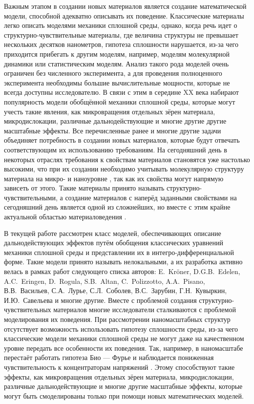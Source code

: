\ifsynopsis
Важным этапом в создании новых материалов является создание математической модели, способной адекватно описывать их поведение. Классические материалы легко описать моделями механики сплошной среды, однако, когда речь идет о структурно-чувствительные материалы, где величина структуры не превышает нескольких десятков нанометров, гипотеза сплошности нарушается, из-за чего приходится прибегать к другим моделям, например, моделям молекулярной динамики или статистическим моделям. Анализ такого рода моделей очень ограничен без численного эксперимента, а для проведения полноценного эксперимента необходимы большие вычислительные мощности, которые не всегда доступны исследователю. В связи с этим в середине XX века набирают популярность модели обобщённой механики сплошной среды, которые могут учесть такие явления, как микровращения отдельных зёрен материала, микродислокации, различные дальнодействующие и многие другие другие масштабные эффекты.
\else
Все перечисленные ранее и многие другие задачи объединяет потребность в создании новых материалов, которые будут отвечать соответствующим их использованию требованиям. На сегодняшний день в некоторых отраслях требования к свойствам материалов становятся уже настолько высокими, что при их создании необходимо учитывать молекулярную структуру материала на микро- и наноуровне \cite{MaterialStructure1, MaterialStructure2, MaterialStructure3}, так как их свойства могут напрямую зависеть от этого. Такие материалы принято называть структурно-чувствительными, а создание материалов с наперёд заданными свойствами на сегодняшний день является одной из сложнейших, но вместе с этим крайне актуальной областью материаловедения \cite{Auxetics}.
\fi

\ifsynopsis
В текущей работе рассмотрен класс моделей, обеспечивающих описание дальнодействующих эффектов путём обобщения классических уравнений механики сплошной среды и представлении их в интегро-дифференциальной форме. Такие модели принято называть нелокальными, а их разработка активно велась в рамках работ следующего списка авторов: E.~Kr{\"o}ner, D.G.B.~Edelen, A.C.~Eringen, D.~Rogula, S.B.~Altan, C.~Polizzotto, A.A.~Pisano, В.В.~Васильев, С.А.~Лурье, С.Л.~Соболев, В.С.~Зарубин, Г.Н.~Кувыркин, И.Ю.~Савельева и многие другие.
\else
Вместе с проблемой создания структурно-чувствительных материалов многие исследователи сталкиваются с проблемой моделирования их поведения. При рассмотрении наномасштабных структур отсутствует возможность использовать гипотезу сплошности среды, из-за чего классические модели механики сплошной среды не могут даже на качественном уровне передать все особенности их поведения. Так, например, в наномасштабе перестаёт работать гипотеза Био --- Фурье \cite{FourierLaw1, FourierLaw2} и наблюдается пониженная чувствительность к концентраторам напряжений \cite{ConcentrationInsensitive1, ConcentrationInsensitive2}. Этому способствуют такие эффекты, как микровращения отдельных зёрен материала, микродислокации, различные дальнодействующие и многие другие масштабные эффекты, которые могут быть смоделированы только при помощи новых математических моделей.
\fi

